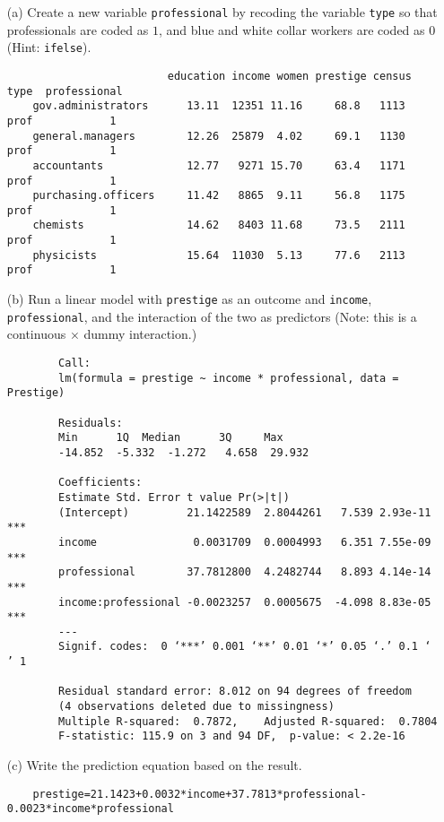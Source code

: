 \documentclass[12pt,letterpaper]{article}
\begin{document}
\newpage
\begin{enumerate}
	
	\item [(a)]
	Create a new variable \texttt{professional} by recoding the variable \texttt{type} so that professionals are coded as $1$, and blue and white collar workers are coded as $0$ (Hint: \texttt{ifelse}).
		
	\begin{verbatim} 
	                     education income women prestige census  type  professional
	gov.administrators      13.11  12351 11.16     68.8   1113  prof            1
	general.managers        12.26  25879  4.02     69.1   1130  prof            1
	accountants             12.77   9271 15.70     63.4   1171  prof            1
	purchasing.officers     11.42   8865  9.11     56.8   1175  prof            1
	chemists                14.62   8403 11.68     73.5   2111  prof            1
	physicists              15.64  11030  5.13     77.6   2113  prof            1

   \end{verbatim}	

	\item [(b)]
	Run a linear model with \texttt{prestige} as an outcome and \texttt{income}, \texttt{professional}, and the interaction of the two as predictors (Note: this is a continuous $\times$ dummy interaction.)
      
	\begin{verbatim} 
		Call:
		lm(formula = prestige ~ income * professional, data = Prestige)
		
		Residuals:
		Min      1Q  Median      3Q     Max 
		-14.852  -5.332  -1.272   4.658  29.932 
		
		Coefficients:
		Estimate Std. Error t value Pr(>|t|)    
		(Intercept)         21.1422589  2.8044261   7.539 2.93e-11 ***
		income               0.0031709  0.0004993   6.351 7.55e-09 ***
		professional        37.7812800  4.2482744   8.893 4.14e-14 ***
		income:professional -0.0023257  0.0005675  -4.098 8.83e-05 ***
		---
		Signif. codes:  0 ‘***’ 0.001 ‘**’ 0.01 ‘*’ 0.05 ‘.’ 0.1 ‘ ’ 1
		
		Residual standard error: 8.012 on 94 degrees of freedom
		(4 observations deleted due to missingness)
		Multiple R-squared:  0.7872,	Adjusted R-squared:  0.7804 
		F-statistic: 115.9 on 3 and 94 DF,  p-value: < 2.2e-16
	\end{verbatim}	
	
	\item [(c)]
	Write the prediction equation based on the result.
	\begin{verbatim} 
	prestige=21.1423+0.0032*income+37.7813*professional-0.0023*income*professional
    \end{verbatim}


\end{enumerate}
\end{document}
